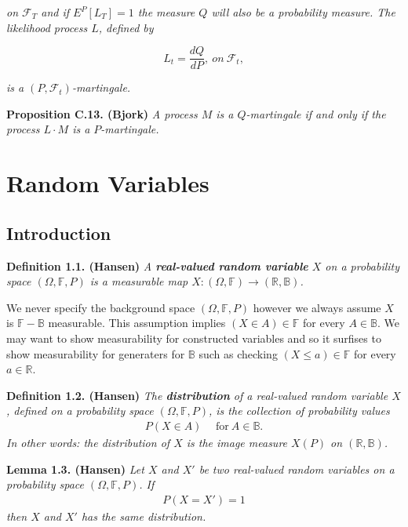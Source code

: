 \documentclass[
]{book}
\begin{document}
\emph{on \(\mathcal{F}_T\) and if \(E^P[L_T]=1\) the measure \(Q\) will also be a probability measure. The likelihood process \(L\), defined by}

\[
L_t=\frac{dQ}{dP},\ on\ \mathcal{F}_t,\tag{C.8}
\]

\emph{is a \((P,\mathcal{F}_t)\)-martingale.}

\textbf{Proposition C.13. (Bjork)} \emph{A process \(M\) is a \(Q\)-martingale if and only if the process \(L\cdot M\) is a \(P\)-martingale.}

\hypertarget{random-variables-1}{%
\chapter{Random Variables}\label{random-variables-1}}

\hypertarget{introduction-1}{%
\section{Introduction}\label{introduction-1}}

\textbf{Definition 1.1. (Hansen)} \emph{A \textbf{real-valued random variable} \(X\) on a probability space \((\Omega, \mathbb{F},P)\) is a measurable map \(X : (\Omega,\mathbb{F})\to (\mathbb{R},\mathbb{B})\).}

We never specify the background space \((\Omega, \mathbb{F},P)\) however we always assume \(X\) is \(\mathbb{F}-\mathbb{B}\) measurable. This assumption implies \((X\in A)\in \mathbb{F}\) for every \(A\in \mathbb{B}\). We may want to show measurability for constructed variables and so it surfises to show measurability for generaters for \(\mathbb{B}\) such as checking \((X\le a)\in\mathbb{F}\) for every \(a\in\mathbb{R}\).

\textbf{Definition 1.2. (Hansen)} \emph{The \textbf{distribution} of a real-valued random variable \(X\), defined on a probability space \((\Omega,\mathbb{F},P)\), is the collection of probability values}
\begin{align*}
    P(X\in A)\hspace{15pt}\text{for}\ A\in \mathbb{B}.\tag{1.3}
\end{align*}
\emph{In other words: the distribution of \(X\) is the image measure \(X(P)\) on \((\mathbb{R},\mathbb{B})\).}

\textbf{Lemma 1.3. (Hansen)} \emph{Let \(X\) and \(X'\) be two real-valued random variables on a probability space \((\Omega,\mathbb{F},P)\). If}
\begin{align*}
    P(X=X')=1
\end{align*}
\emph{then \(X\) and \(X'\) has the same distribution.}
\end{document}
